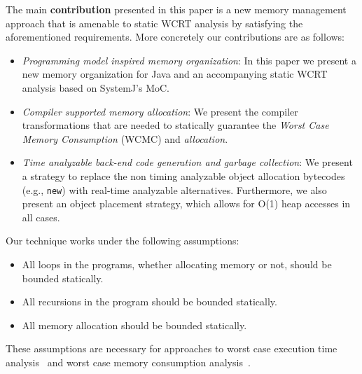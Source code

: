 
The main \textbf{contribution} presented in this paper is a new memory
management approach that is amenable to static WCRT analysis by
satisfying the aforementioned requirements. More concretely our
contributions are as follows:

\begin{itemize}
\item \textit{Programming model inspired memory organization}: In this
  paper we present a new memory organization for Java and an
  accompanying static WCRT analysis based on SystemJ's MoC.
\item \textit{Compiler supported memory allocation}: We present the
  compiler transformations that are needed to statically guarantee the
  \textit{Worst Case Memory Consumption} (WCMC) and \textit{allocation}.
\item \textit{Time analyzable back-end code generation and garbage
    collection}: We present a strategy to replace the non timing
  analyzable object allocation bytecodes (e.g., \texttt{new}) with
  real-time analyzable alternatives. Furthermore, we also present an
  object placement strategy, which allows for O(1) heap accesses in all
  cases.
\end{itemize}

{\color{red}
  
  Our technique works under the following assumptions:
  \begin{itemize}
  \item All loops in the programs, whether allocating memory or not,
    should be bounded statically.
  \item All recursions in the program should be bounded statically.
  \item All memory allocation should be bounded statically.
  \end{itemize}
  
  These assumptions are necessary for approaches to worst case execution
  time analysis~\cite{jop:wcet:jtres06} and worst case memory
  consumption analysis~\cite{andersen2013worst}.

}







